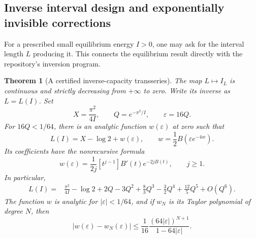\documentclass[11pt,a4paper]{article}
\newtheorem{theorem}{Theorem}[section]
\theoremstyle{definition}
\theoremstyle{remark}
\begin{document}
\subsection{Inverse interval design and exponentially invisible corrections}
For a prescribed small equilibrium energy $I>0$, one may ask for the
interval length $L$ producing it. This connects the equilibrium result
directly with the repository's inversion program.

\begin{theorem}[A certified inverse-capacity transseries]
\label{thm:inverse-capacity}
The map $L\mapsto I_L$ is continuous and strictly decreasing from $+\infty$
to zero. Write its inverse as $L=L(I)$. Set
\begin{equation}
 X=\frac{\pi^2}{4I},\qquad Q=e^{-\pi^2/I},\qquad\varepsilon=16Q.
 \label{eq:inverseparameters}
\end{equation}
For $16Q<1/64$, there is an analytic function $w(\varepsilon)$ at zero such that
\begin{equation}
 L(I)=X-\log2+w(\varepsilon),\qquad
 w=\frac12B(\varepsilon e^{-4w}).
 \label{eq:inversefixedpoint}
\end{equation}
Its coefficients have the nonrecursive formula
\begin{equation}
 [\varepsilon^j]w(\varepsilon)
 =\frac1{2j}[t^{j-1}]B'(t)e^{-2jB(t)},\qquad j\ge1.
 \label{eq:inversecoeff}
\end{equation}
In particular,
\begin{align}
 L(I)={}&\frac{\pi^2}{4I}-\log2+2Q-3Q^2+\frac83Q^3
 -\frac32Q^4+\frac{12}{5}Q^5+O(Q^6).
 \label{eq:inverseexpansion}
\end{align}
The function $w$ is analytic for $|\varepsilon|<1/64$, and if $w_N$ is
its Taylor polynomial of degree $N$, then
\begin{equation}
 |w(\varepsilon)-w_N(\varepsilon)|
 \le\frac1{16}\frac{(64|\varepsilon|)^{N+1}}{1-64|\varepsilon|}.
 \label{eq:inversebound}
\end{equation}
\end{theorem}
\end{document}
